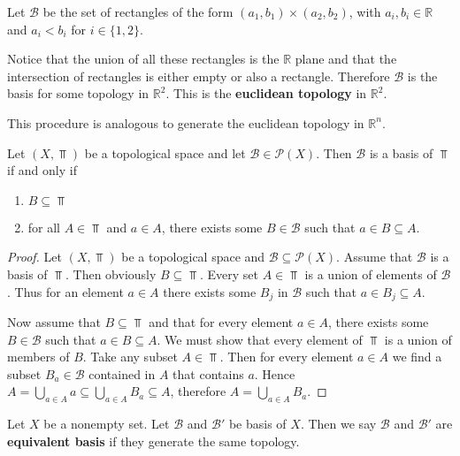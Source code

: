 \documentclass[../../main/main.tex]{subfiles}
\begin{document}
\begin{definition}
  Let $\mathcal{B}$ be the set of rectangles of the form $(a_{1}, b_{1}) \times (a_{2}, b_{2})$, with $a_{i}, b_{i} \in \mathbb{R}$ and $a_{i} < b_{i}$ for $i \in \{1, 2\}$.
\end{definition}

\begin{remark}
Notice that the union of all these rectangles is the $\mathbb{R}$ plane and that the intersection of rectangles is either empty or also a rectangle. Therefore $\mathcal{B}$ is the basis for some topology in $\mathbb{R}^{2}$. This is the {\bf euclidean topology} in $\mathbb{R}^{2}$.
\end{remark}

This procedure is analogous to generate the euclidean topology in $\mathbb{R}^{n}$.

\begin{definition}
  \label{def:topology-given-X}
  Let $(X, \Top)$ be a topological space and let $\mathcal{B} \in \mathcal{P}(X)$. Then $\mathcal{B}$ is a basis of $\Top$ if and only if
  \begin{enumerate}
    \item $B \subseteq \Top$
    \item for all $A \in \Top$ and $a \in A$,  there exists some $B \in \mathcal{B}$ such that $a \in B \subseteq A$.
  \end{enumerate}
\end{definition}
\begin{proof}
  Let $(X, \Top)$ be a topological space and $\mathcal{B} \subseteq \mathcal{P}(X)$. Assume that $\mathcal{B}$ is a basis of $\Top$. Then obviously $B \subseteq \Top$. Every set $A \in \Top$ is a union of elements of $\mathcal{B}$. Thus for an element $a \in A$ there exists some $B_{j}$ in $\mathcal{B}$ such that $a \in B_{j} \subseteq A$.
 
  Now assume that $B \subseteq \Top$ and that for every element $a \in A$, there exists some $B \in \mathcal{B}$ such that $a \in B \subseteq A$. We must show that every element of $\Top$ is a union of members of $B$. Take any subset $A \in \Top$. Then for every element $a \in A$ we find a subset $B_{a} \in \mathcal{B}$ contained in $A$ that contains $a$. Hence $A = \bigcup_{a \in A} a \subseteq \bigcup_{a \in A} B_{a} \subseteq A$, therefore $A = \bigcup_{a \in A} B_{a}$.
\end{proof}

\begin{definition}
  Let $X$ be a nonempty set. Let $\mathcal{B}$ and $\mathcal{B'}$ be basis of $X$. Then we say $\mathcal{B}$ and $\mathcal{B'}$ are {\bf equivalent basis} if they generate the same topology.
\end{definition}
\end{document}
